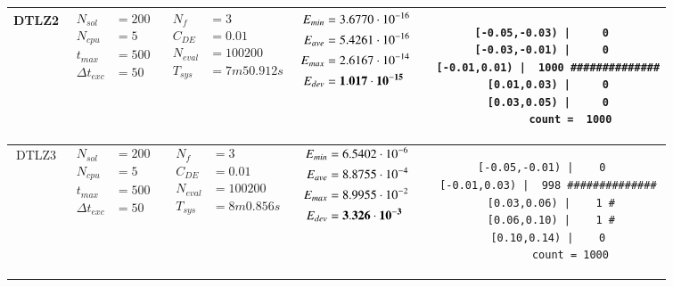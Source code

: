 \begin{table*} [!t]
\begin{tabular}[c]{ccccc}
DTLZ2
&
{$\!\begin{aligned}
    N_{sol}        &= 200 \\
	N_{cpu}        &= 5 \\
	t_{max}        &= 500 \\
	\Delta t_{exc} &= 50
\end{aligned}$}
&
{$\!\begin{aligned}
	N_{f}    &= 3 \\
	C_{DE}   &= 0.01 \\
	N_{eval} &= 100200 \\
	T_{sys}  &= 7m50.912s
\end{aligned}$}
&
{$\!\begin{aligned}
    E_{min} &= 3.6770\cdot 10^{-16} \\
    E_{ave} &= 5.4261\cdot 10^{-16} \\
    E_{max} &= 2.6167\cdot 10^{-14} \\
    E_{dev} &= {\bf 1.017\cdot 10^{-15}}
\end{aligned}$}
&
\begin{minipage}{4.1cm} \fontsize{5pt}{6pt}
\begin{verbatim}
 [-0.05,-0.03) |     0 
 [-0.03,-0.01) |     0 
  [-0.01,0.01) |  1000 ##############
   [0.01,0.03) |     0 
   [0.03,0.05) |     0 
         count =  1000
 \end{verbatim}
\end{minipage} \\

\hline



DTLZ3
&
{$\!\begin{aligned}
    N_{sol}        &= 200 \\
	N_{cpu}        &= 5 \\
	t_{max}        &= 500 \\
	\Delta t_{exc} &= 50
\end{aligned}$}
&
{$\!\begin{aligned}
	N_{f}    &= 3 \\
	C_{DE}   &= 0.01 \\
	N_{eval} &= 100200 \\
	T_{sys}  &= 8m0.856s
\end{aligned}$}
&
{$\!\begin{aligned}
    E_{min} &= 6.5402\cdot 10^{-6} \\
    E_{ave} &= 8.8755\cdot 10^{-4} \\
    E_{max} &= 8.9955\cdot 10^{-2} \\
    E_{dev} &= {\bf 3.326\cdot 10^{-3}}
\end{aligned}$}
&
\begin{minipage}{4.1cm} \fontsize{5pt}{6pt}
\begin{verbatim}
 [-0.05,-0.01) |    0 
  [-0.01,0.03) |  998 ##############
   [0.03,0.06) |    1 #
   [0.06,0.10) |    1 #
   [0.10,0.14) |    0 
         count = 1000
 \end{verbatim}
\end{minipage} \\


\end{tabular}
\end{table*}
